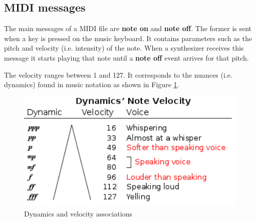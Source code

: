 \subsection{MIDI messages}
The main messages of a MIDI file are \textbf{note on} and \textbf{note off}. The former is sent when a key is pressed on the music keyboard. It contains parameters such as the pitch and velocity (i.e. intensity) of the note. When a synthesizer receives this message it starts playing that note until a \textbf{note off} event arrives for that pitch.

\par
The velocity ranges between 1 and 127. It corresponds to the nuances (i.e. dynamics) found in music notation as shown in Figure \ref{fig:midi_velocity}.

\begin{figure}[H]
	\caption[Dynamics and velocity associations]{Dynamics and velocity associations~\cite{midi_dynamics}}
	\centering
	\label{fig:midi_velocity}
	\includegraphics[width=1\textwidth, height=0.9\textheight, keepaspectratio]{"resources/note_velocity"}
\end{figure}